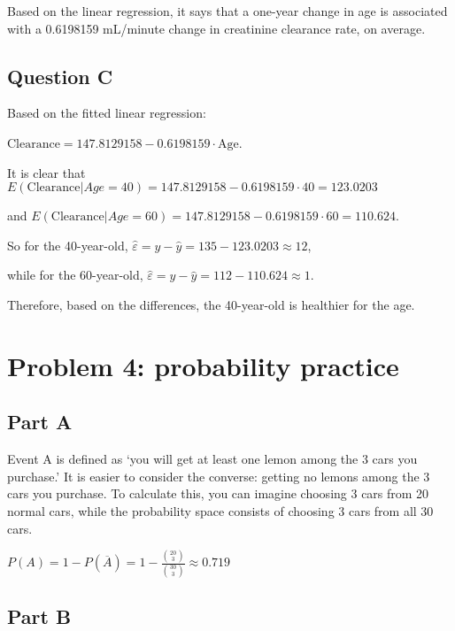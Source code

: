 \documentclass[
]{article}
\begin{document}
Based on the linear regression, it says that a one-year change in age is
associated with a 0.6198159 mL/minute change in creatinine clearance
rate, on average.

\newpage

\hypertarget{question-c}{%
\subsection{Question C}\label{question-c}}

Based on the fitted linear regression:

\(\text{Clearance}=147.8129158-0.6198159\cdot\text{Age}\).

It is clear that
\(E(\text{Clearance}|Age=40)=147.8129158-0.6198159\cdot40=123.0203\)

and \(E(\text{Clearance}|Age=60)=147.8129158-0.6198159\cdot60=110.624\).

So for the 40-year-old,
\(\hat\varepsilon=y-\hat y=135-123.0203\approx12\),

while for the 60-year-old,
\(\hat\varepsilon=y-\hat y=112-110.624\approx1\).

Therefore, based on the differences, the 40-year-old is healthier for
the age.

\newpage

\hypertarget{problem-4-probability-practice}{%
\section{Problem 4: probability
practice}\label{problem-4-probability-practice}}

\hypertarget{part-a-1}{%
\subsection{Part A}\label{part-a-1}}

Event A is defined as `you will get at least one lemon among the 3 cars
you purchase.' It is easier to consider the converse: getting no lemons
among the 3 cars you purchase. To calculate this, you can imagine
choosing 3 cars from 20 normal cars, while the probability space
consists of choosing 3 cars from all 30 cars.

\(P(A)=1-P(\overline A)=1-\frac{\binom{20}{3}}{\binom{30}{3}}\approx0.719\)

\hypertarget{part-b-1}{%
\subsection{Part B}\label{part-b-1}}
\end{document}
